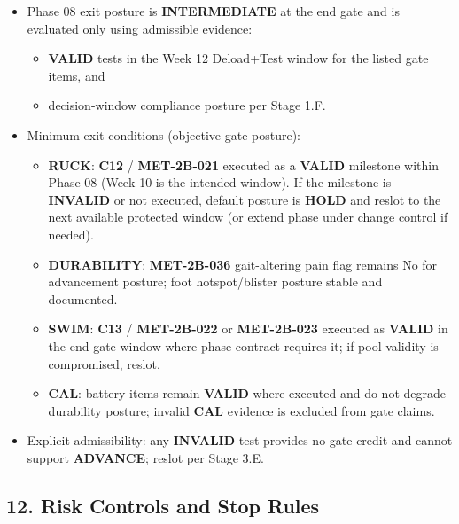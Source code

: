 \documentclass[10pt]{article}
\begin{document}
\begin{itemize}
\item Phase 08 exit posture is \textbf{INTERMEDIATE} at the end gate and is evaluated only using admissible evidence:
  \begin{itemize}
  \item \textbf{VALID} tests in the Week 12 Deload+Test window for the listed gate items, and
  \item decision-window compliance posture per Stage 1.F.
  \end{itemize}
\item Minimum exit conditions (objective gate posture):
  \begin{itemize}
  \item \textbf{RUCK}: \textbf{C12} / \textbf{MET-2B-021} executed as a \textbf{VALID} milestone within Phase 08 (Week 10 is the intended window). If the milestone is \textbf{INVALID} or not executed, default posture is \textbf{HOLD} and reslot to the next available protected window (or extend phase under change control if needed).
  \item \textbf{DURABILITY}: \textbf{MET-2B-036} gait-altering pain flag remains No for advancement posture; foot hotspot/blister posture stable and documented.
  \item \textbf{SWIM}: \textbf{C13} / \textbf{MET-2B-022} or \textbf{MET-2B-023} executed as \textbf{VALID} in the end gate window where phase contract requires it; if pool validity is compromised, reslot.
  \item \textbf{CAL}: battery items remain \textbf{VALID} where executed and do not degrade durability posture; invalid \textbf{CAL} evidence is excluded from gate claims.
  \end{itemize}
\item Explicit admissibility: any \textbf{INVALID} test provides no gate credit and cannot support \textbf{ADVANCE}; reslot per Stage 3.E.
\end{itemize}

\subsection*{12. Risk Controls and Stop Rules}
\end{document}
